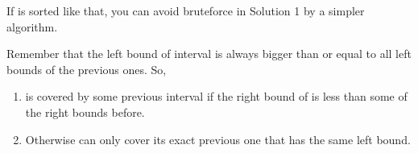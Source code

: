 \documentclass[letterpaper,12pt,english]{book}
\begin{document}
\sphinxAtStartPar
If  is sorted like that, you can avoid bruteforce in Solution 1 by a simpler algorithm.

\sphinxAtStartPar
{}

\sphinxAtStartPar
Remember that the left bound of interval  is always bigger than or equal to all left bounds of the previous ones. So,
\begin{enumerate}
%
\item {} 
\sphinxAtStartPar
{} is covered by some previous interval if the right bound of  is less than some of the right bounds before.

\item {} 
\sphinxAtStartPar
Otherwise  can only cover its exact previous one that has the same left bound.

\end{enumerate}
\end{document}

